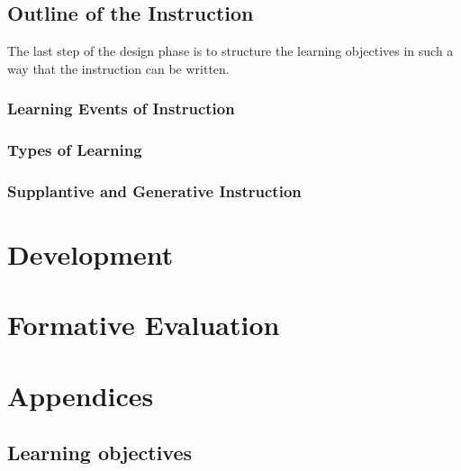 \documentclass[11pt,twoside]{report} %
\begin{document}
\section{Outline of the Instruction}

The last step of the design phase is to structure the learning objectives in such a way that the instruction can be written.

\subsection{Learning Events of Instruction}

\subsection{Types of Learning}

\subsection{Supplantive and Generative Instruction}


\chapter{Development}
\thispagestyle{fancy}


\chapter{Formative Evaluation}
\thispagestyle{fancy}




\chapter{Appendices}

\appendix

\section{Learning objectives}
\label{app:learningobjectives}
\end{document}
